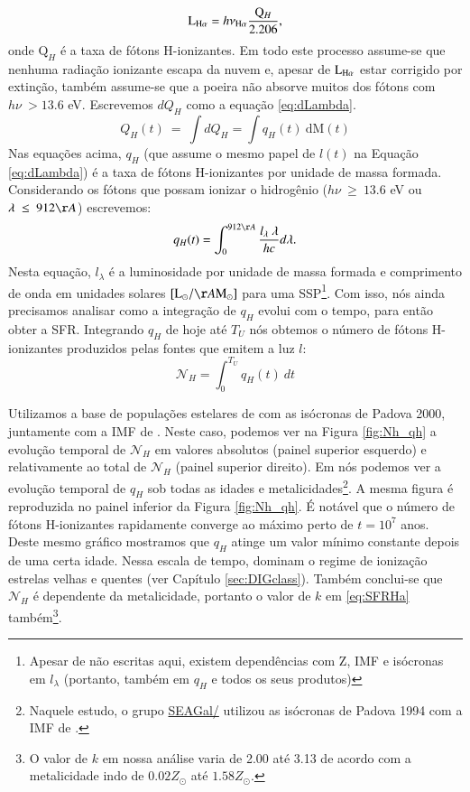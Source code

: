 \begin{equation}
	\LHalpha = h \nu_{\Ha} \frac{\mathrm{Q}_H}{2.206},
	\label{eq:LHa_recomb_theory}
\end{equation}
\noindent onde $\mathrm{Q}_H$ é a taxa de fótons H-ionizantes. Em todo este processo assume-se que nenhuma radiação ionizante escapa da nuvem e, apesar de $\LHalpha$ estar corrigido por extinção, também assume-se que a poeira não absorve muitos dos fótons com $h\nu\ > 13.6$ eV. Escrevemos $dQ_H$ como a equação \eqref{eq:dLambda}.
\begin{equation}
	Q_H(t)\ =\ \int dQ_H = \int q_H(t)\ \mathrm{d}\mathrm{M}(t)
	\label{eq:QH_t}
\end{equation}
\noindent Nas equações acima, $q_H$ (que assume o mesmo papel de $l(t)$ na Equação \ref{eq:dLambda}) é a taxa de fótons H-ionizantes por unidade de massa formada. Considerando os fótons que possam ionizar o hidrogênio ($h\nu\ \geq\ 13.6$ eV ou $\lambda\ \leq\ 912\AA$) escrevemos:
\begin{equation}
	q_H(t) = \int_0^{912\AA} \frac{l_\lambda\ \lambda}{h c} d\lambda.
	\label{eq:qH}
\end{equation}
\noindent Nesta equação, $l_\lambda$ é a luminosidade por unidade de massa formada e comprimento de onda em unidades solares $[\textrm{L}_\odot/\AA\textrm{M}_\odot]$ para uma SSP\footnote{Apesar de não escritas aqui, existem dependências com Z, IMF e isócronas em $l_\lambda$ (portanto, também em $q_H$ e todos os seus produtos)}. Com isso, nós ainda precisamos analisar como a integração de $q_H$ evolui com o tempo, para então obter a SFR. Integrando $q_H$ de hoje até $T_U$ nós obtemos o número de fótons H-ionizantes produzidos pelas fontes que emitem a luz $l$:
\begin{equation}
	\mathcal{N}_H = \int_0^{T_U} q_H(t)\ dt
	\label{eq:Nh}
\end{equation}

Utilizamos a base de populações estelares de \citet{Bruzual.Charlot.2003} com as isócronas de Padova 2000, juntamente com a IMF de \citet{Salpeter.1955a}. Neste caso, podemos ver na Figura \ref{fig:Nh_qh} a evolução temporal de $\mathcal{N}_H$ em valores absolutos (painel superior esquerdo) e relativamente ao total de $\mathcal{N}_H$ (painel superior direito). Em \citet[Figura 2b]{CidFernandes.etal.2011a} nós podemos ver a evolução temporal de $q_H$ sob todas as idades e metalicidades\footnote{Naquele estudo, o grupo \href{http://starlight.ufsc.br}{SEAGal/\STARLIGHT} utilizou as isócronas de Padova 1994 com a IMF de \citet{Chabrier.2003a}.}. A mesma figura é reproduzida no painel inferior da Figura \ref{fig:Nh_qh}. É notável que o número de fótons H-ionizantes rapidamente converge ao máximo perto de $t = 10^7$ anos. Deste mesmo gráfico mostramos que $q_H$ atinge um valor mínimo constante depois de uma certa idade. Nessa escala de tempo, dominam o regime de ionização estrelas velhas e quentes (ver Capítulo \ref{sec:DIGclass}). Também conclui-se que $\mathcal{N}_H$ é dependente da metalicidade, portanto o valor de $k$ em \eqref{eq:SFRHa} também\footnote{O valor de $k$ em nossa análise varia de 2.00 até 3.13 de acordo com a metalicidade indo de $0.02 Z_\odot$ até $1.58 Z_\odot$.}.

